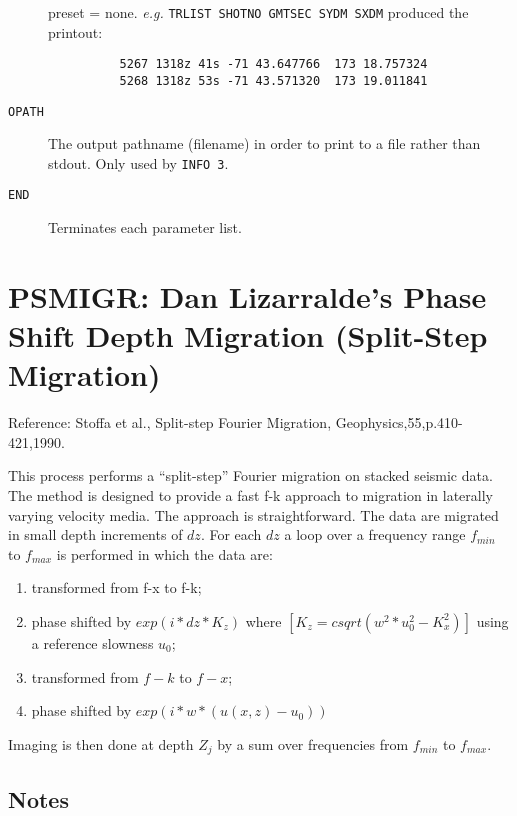 \begin{description}
         \Gls{preset} = none.  \textit{e.g.}  \texttt{TRLIST SHOTNO GMTSEC SYDM SXDM}
          produced the printout:
\begin{verbatim}
          5267 1318z 41s -71 43.647766  173 18.757324
          5268 1318z 53s -71 43.571320  173 19.011841
\end{verbatim}

\item[\texttt{OPATH}] The output pathname (filename) in order to print to a file rather
         than stdout.  Only used by \texttt{INFO 3}.

\item[\texttt{END}] Terminates each parameter list.
\end{description}

\section{PSMIGR: Dan Lizarralde's Phase Shift Depth Migration (Split-Step Migration)}
\label{cmd_psmigr}


Reference: Stoffa et al., Split-step Fourier Migration,
                          Geophysics,55,p.410-421,1990. \cite{Stoffa1990}

This process performs a ``split-step'' Fourier migration on
stacked seismic data.  The method is designed to provide a
fast f-k approach to migration in laterally varying velocity
media.  The approach is straightforward.  The data are migrated
in small depth increments of $dz$.  For each $dz$ a loop over a
frequency range $f_{min}$ to $f_{max}$ is performed in which the data are:

\begin{enumerate}
\item transformed from f-x to f-k;
\item phase shifted by $exp(i*dz*K_{z})$ where $[K_{z}=csqrt(w^2*u_{0}^2-K_{x}^2)]$ using a reference slowness $u_{0}$;
\item transformed from $f-k$ to $f-x$;
\item phase shifted by $exp(i*w*(u(x,z)-u_{0}))$
\end{enumerate}

Imaging is then done at depth $Z_{j}$ by a sum over frequencies
from $f_{min}$ to $f_{max}$.

\subsection{Notes}

